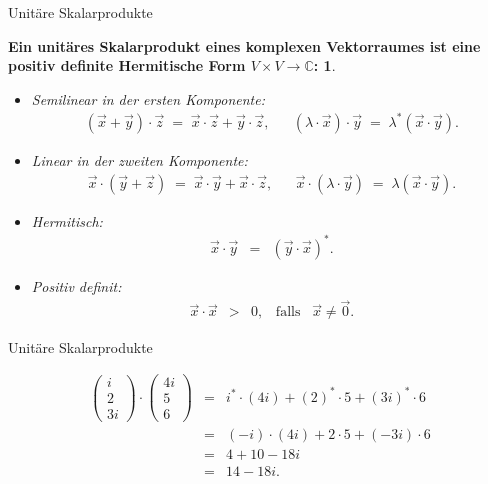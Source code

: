 \documentclass[german]{beamer}
\newcommand{\bq}{\begin{eqnarray*}}
\newcommand{\eq}{\end{eqnarray*}}
\newtheorem*{mytheorem10}{Ein unit\"ares Skalarprodukt eines komplexen Vektorraumes ist eine positiv definite Hermitische Form $V \times V \rightarrow {\mathbb C}$:}
\begin{document}
\begin{frame}{Unit\"are Skalarprodukte}

\begin{mytheorem10}
\begin{itemize}
\item Semilinear in der ersten Komponente:
{\small
\bq
 \left( \vec{x} + \vec{y} \right) \cdot \vec{z} 
 \; = \; \vec{x} \cdot \vec{z} + \vec{y} \cdot \vec{z},
 & &
 \left( \lambda \cdot \vec{x} \right) \cdot \vec{y} \; = \; \lambda^\ast \left( \vec{x} \cdot \vec{y} \right).
\eq
}
\item Linear in der zweiten Komponente:
{\small
\bq
 \vec{x} \cdot \left( \vec{y} + \vec{z} \right)  
 \; = \; \vec{x} \cdot \vec{y} + \vec{x} \cdot \vec{z},
 & &
 \vec{x} \cdot \left( \lambda \cdot \vec{y} \right) \; = \; \lambda \left( \vec{x} \cdot \vec{y} \right).
\eq
}
\item Hermitisch:
{\small
\bq
 \vec{x} \cdot \vec{y} & = & \left( \vec{y} \cdot \vec{x} \right)^\ast.
\eq
}
\item Positiv definit:
{\small
\bq
 \vec{x} \cdot \vec{x} & > & 0, \;\;\;\mbox{falls}\;\;\; \vec{x} \neq \vec{0}.
\eq
}
\end{itemize}
\end{mytheorem10}

\end{frame}

\begin{frame}{Unit\"are Skalarprodukte}

\begin{example}
\bq
 \left( \begin{array}{c} i \\ 2 \\ 3i \end{array} \right)
 \cdot
 \left( \begin{array}{c} 4i \\ 5 \\ 6 \end{array} \right)
 & = &
 i^\ast \cdot \left(4i\right) + \left(2\right)^\ast \cdot 5 + \left(3i\right)^\ast \cdot 6
 \nonumber \\
 & = & 
 \left(-i\right) \cdot \left(4i\right) + 2 \cdot 5 + \left(-3i\right) \cdot 6
 \nonumber \\
 & = &
 4 + 10 - 18 i
 \nonumber \\
 & = &
 14 - 18 i.
\eq
\end{example}

\end{frame}
\end{document}
